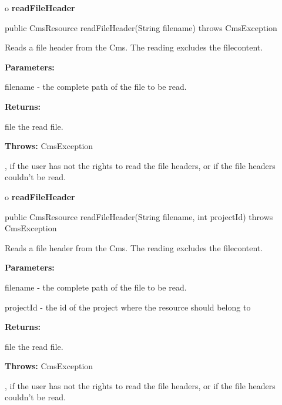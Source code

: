 o {\bf readFileHeader} 

\begin{PRE}
 public CmsResource readFileHeader(String filename) throws CmsException
\end{PRE}

\begin{description}
\htmlDD Reads a file header from the Cms. \htmlBR
The reading excludes the filecontent. 

\begin{description}
\item {\bf Parameters:}  

filename - the complete path of the file to be read.  
\item {\bf Returns:}  

file the read file.  
\item {\bf Throws:} CmsException  

, if the user has not the rights to read the file headers, or if the file
headers couldn't be read.  
\end{description}

\end{description}

o {\bf readFileHeader} 

\begin{PRE}
 public CmsResource readFileHeader(String filename,
                                   int projectId) throws CmsException
\end{PRE}

\begin{description}
\htmlDD Reads a file header from the Cms. \htmlBR
The reading excludes the filecontent. 

\begin{description}
\item {\bf Parameters:}  

filename - the complete path of the file to be read.  

projectId - the id of the project where the resource should belong to  
\item {\bf Returns:}  

file the read file.  
\item {\bf Throws:} CmsException  

, if the user has not the rights to read the file headers, or if the file
headers couldn't be read.  
\end{description}

\end{description}

